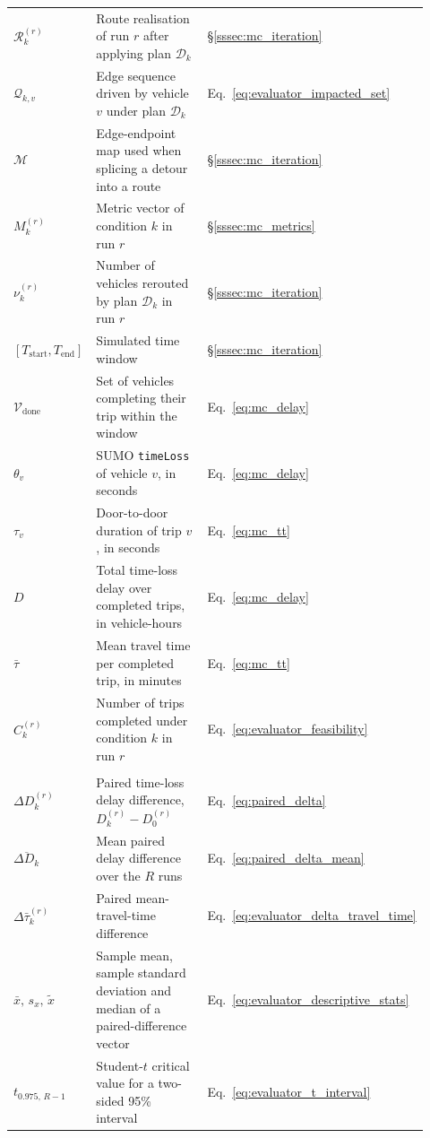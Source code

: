 \begin{longtable}{@{}p{0.16\linewidth}>{\raggedright\arraybackslash}p{0.60\linewidth}p{0.16\linewidth}@{}}
$\mathcal{R}^{(r)}_k$ & Route realisation of run $r$ after applying plan $\mathcal{D}_k$ & \S\ref{sssec:mc_iteration} \\
$\mathcal{Q}_{k,v}$ & Edge sequence driven by vehicle $v$ under plan $\mathcal{D}_k$ & Eq.~\eqref{eq:evaluator_impacted_set} \\
$\mathcal{M}$ & Edge-endpoint map used when splicing a detour into a route & \S\ref{sssec:mc_iteration} \\
$M^{(r)}_k$ & Metric vector of condition $k$ in run $r$ & \S\ref{sssec:mc_metrics} \\
$\nu^{(r)}_k$ & Number of vehicles rerouted by plan $\mathcal{D}_k$ in run $r$ & \S\ref{sssec:mc_iteration} \\
$[T_{\mathrm{start}}, T_{\mathrm{end}}]$ & Simulated time window & \S\ref{sssec:mc_iteration} \\
$\mathcal{V}_{\mathrm{done}}$ & Set of vehicles completing their trip within the window & Eq.~\eqref{eq:mc_delay} \\
$\theta_v$ & SUMO \texttt{timeLoss} of vehicle $v$, in seconds & Eq.~\eqref{eq:mc_delay} \\
$\tau_v$ & Door-to-door duration of trip $v$, in seconds & Eq.~\eqref{eq:mc_tt} \\
$D$ & Total time-loss delay over completed trips, in vehicle-hours & Eq.~\eqref{eq:mc_delay} \\
$\bar{\tau}$ & Mean travel time per completed trip, in minutes & Eq.~\eqref{eq:mc_tt} \\
$C^{(r)}_k$ & Number of trips completed under condition $k$ in run $r$ & Eq.~\eqref{eq:evaluator_feasibility} \\
\addlinespace
\multicolumn{3}{@{}l}{\textbf{Evaluation and decision support}}\\
\addlinespace
$\Delta D^{(r)}_k$ & Paired time-loss delay difference, $D^{(r)}_k - D^{(r)}_0$ & Eq.~\eqref{eq:paired_delta} \\
$\overline{\Delta D_k}$ & Mean paired delay difference over the $R$ runs & Eq.~\eqref{eq:paired_delta_mean} \\
$\Delta\bar{\tau}^{(r)}_k$ & Paired mean-travel-time difference & Eq.~\eqref{eq:evaluator_delta_travel_time} \\
$\bar{x},\,s_x,\,\tilde{x}$ & Sample mean, sample standard deviation and median of a paired-difference vector & Eq.~\eqref{eq:evaluator_descriptive_stats} \\
$t_{0.975,\,R-1}$ & Student-$t$ critical value for a two-sided 95\% interval & Eq.~\eqref{eq:evaluator_t_interval} \\

\end{longtable}
